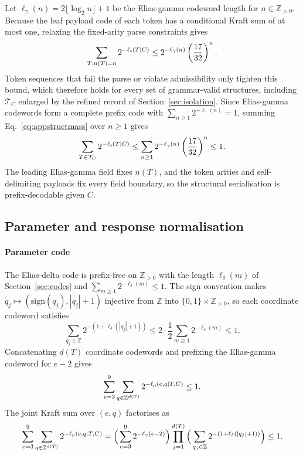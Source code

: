 Let \(\ell_\gamma(n)=2\lfloor\log_2 n\rfloor+1\) be the Elias-gamma codeword length for \(n\in\mathbb Z_{>0}\). Because the leaf payload code of each token has a conditional Kraft sum of at most one, relaxing the fixed-arity parse constraints gives
\begin{equation}\label{eq:appstructmass}
\sum_{T:n(T)=n}2^{-\ell_{\rm s}(T\mid C)}
\le 2^{-\ell_\gamma(n)}\left(\frac{17}{32}\right)^n.
\end{equation}
Token sequences that fail the parse or violate admissibility only tighten this bound, which therefore holds for every set of grammar-valid structures, including \(\mathcal T_C\) enlarged by the refined record of Section~\ref{sec:isolation}. Since Elias-gamma codewords form a complete prefix code with \(\sum_{n\ge1}2^{-\ell_\gamma(n)}=1\), summing Eq.~\eqref{eq:appstructmass} over \(n\ge1\) gives
\begin{equation}\label{eq:appstructkraft}
\sum_{T\in\mathcal T_C}2^{-\ell_{\rm s}(T\mid C)}
\le \sum_{n\ge1}2^{-\ell_\gamma(n)}\left(\frac{17}{32}\right)^n
\le 1.
\end{equation}
The leading Elias-gamma field fixes \(n(T)\), and the token arities and self-delimiting payloads fix every field boundary, so the structural serialisation is prefix-decodable given \(C\).

\subsection{Parameter and response normalisation}\label{app:paramresponse}

\paragraph{Parameter code} The Elias-delta code \citep{elias1975codes} is prefix-free on \(\mathbb Z_{>0}\) with the length \(\ell_\delta(m)\) of Section~\ref{sec:codes} and \(\sum_{m\ge1}2^{-\ell_\delta(m)}\le1\). The sign convention makes \(q_j\mapsto(\mathrm{sign}(q_j),|q_j|+1)\) injective from \(\mathbb Z\) into \(\{0,1\}\times\mathbb Z_{>0}\), so each coordinate codeword satisfies
\begin{equation}\label{eq:appparamkraft}
\sum_{q_j\in\mathbb Z}2^{-(1+\ell_\delta(|q_j|+1))}
\le 2\cdot\frac12\sum_{m\ge1}2^{-\ell_\delta(m)}\le 1.
\end{equation}
Concatenating \(d(T)\) coordinate codewords and prefixing the Elias-gamma codeword for \(e-2\) gives
\begin{equation}\label{eq:appparam}
\sum_{e=3}^{9}\sum_{q\in\mathbb Z^{d(T)}}2^{-\ell_{\rm p}(e,q\mid T,C)}\le1.
\end{equation}
The joint Kraft sum over \((e,q)\) factorises as
\begin{equation}\label{eq:appexponent}
\sum_{e=3}^{9}\sum_{q\in\mathbb Z^{d(T)}}2^{-\ell_{\rm p}(e,q\mid T,C)}
=\Big(\sum_{e=3}^{9}2^{-\ell_\gamma(e-2)}\Big)
\prod_{j=1}^{d(T)}\Big(\sum_{q_j\in\mathbb Z}2^{-(1+\ell_\delta(|q_j|+1))}\Big)\le 1.
\end{equation}

